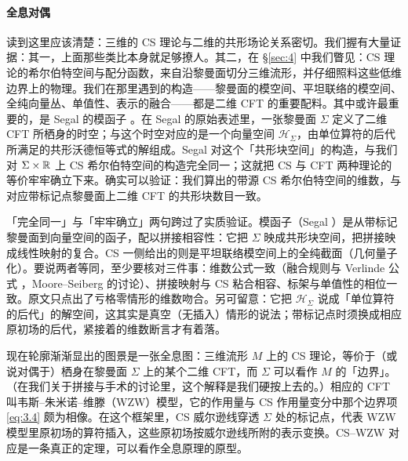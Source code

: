 \paragraph{全息对偶}
读到这里应该清楚：三维的 CS 理论与二维的共形场论关系密切。我们握有大量证据：其一，上面那些类比本身就足够撩人。其二，在 \S\ref{sec:4} 中我们瞥见：CS 理论的希尔伯特空间与配分函数，来自沿黎曼面切分三维流形，并仔细照料这些低维边界上的物理。我们在那里遇到的构造——黎曼面的模空间、平坦联络的模空间、全纯向量丛、单值性、表示的融合——都是二维 CFT 的重要配料。其中或许最重要的，是 Segal 的模函子 \cite{segal}。在 Segal 的原始表述里，一张黎曼面 $\Sigma$ 定义了二维 CFT 所栖身的时空；与这个时空对应的是一个向量空间 $\mathcal{H}_\Sigma$，由单位算符的后代所满足的共形沃德恒等式的解组成。Segal 对这个「共形块空间」的构造，与我们对 $\Sigma\times\mathbb{R}$ 上 CS 希尔伯特空间的构造完全同一；这就把 CS 与 CFT 两种理论的等价牢牢确立下来。确实可以验证：我们算出的带源 CS 希尔伯特空间的维数，与对应带标记点黎曼面上二维 CFT 的共形块数目一致。

\begin{yizhu}[含糊点]
「完全同一」与「牢牢确立」两句跨过了实质验证。模函子（Segal \cite{segal}）是从带标记黎曼面到向量空间的函子，配以拼接相容性：它把 $\Sigma$ 映成共形块空间，把拼接映成线性映射的复合。CS 一侧给出的则是平坦联络模空间上的全纯截面（几何量子化）。要说两者等同，至少要核对三件事：维数公式一致（融合规则与 Verlinde 公式 \cite{verlinde1988}，Moore--Seiberg \cite{moore1989,moore1988} 的讨论）、拼接映射与 CS 粘合相容、标架与单值性的相位一致。原文只点出了亏格零情形的维数吻合。另可留意：它把 $\mathcal{H}_\Sigma$ 说成「单位算符的后代」的解空间，这其实是真空（无插入）情形的说法；带标记点时须换成相应原初场的后代，紧接着的维数断言才有着落。
\end{yizhu}

现在轮廓渐渐显出的图景是一张全息图：三维流形 $M$ 上的 CS 理论，等价于（或说对偶于）栖身在黎曼面 $\Sigma$ 上的某个二维 CFT，而 $\Sigma$ 可以看作 $M$ 的「边界」。（在我们关于拼接与手术的讨论里，这个解释是我们硬按上去的。）相应的 CFT 叫韦斯--朱米诺--维滕（WZW）模型，它的作用量与 CS 作用量变分中那个边界项 \eqref{eq:3.4} 颇为相像。在这个框架里，CS 威尔逊线穿透 $\Sigma$ 处的标记点，代表 WZW 模型里原初场的算符插入，这些原初场按威尔逊线所附的表示变换。CS--WZW 对应是一条真正的定理，可以看作全息原理的原型。

